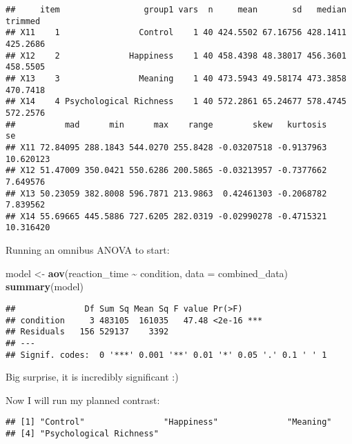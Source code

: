 \documentclass[
]{article}
\newenvironment{Shaded}{\begin{snugshade}}{\end{snugshade}}
\newcommand{\AttributeTok}[1]{\textcolor[rgb]{0.13,0.29,0.53}{#1}}
\newcommand{\CommentTok}[1]{\textcolor[rgb]{0.56,0.35,0.01}{\textit{#1}}}
\newcommand{\FunctionTok}[1]{\textcolor[rgb]{0.13,0.29,0.53}{\textbf{#1}}}
\newcommand{\NormalTok}[1]{#1}
\newcommand{\OtherTok}[1]{\textcolor[rgb]{0.56,0.35,0.01}{#1}}
\newcommand{\SpecialCharTok}[1]{\textcolor[rgb]{0.81,0.36,0.00}{\textbf{#1}}}
\begin{document}
\begin{verbatim}
##     item                 group1 vars  n     mean       sd   median  trimmed
## X11    1                Control    1 40 424.5502 67.16756 428.1411 425.2686
## X12    2              Happiness    1 40 458.4398 48.38017 456.3601 458.5505
## X13    3                Meaning    1 40 473.5943 49.58174 473.3858 470.7418
## X14    4 Psychological Richness    1 40 572.2861 65.24677 578.4745 572.2576
##          mad      min      max    range        skew   kurtosis        se
## X11 72.84095 288.1843 544.0270 255.8428 -0.03207518 -0.9137963 10.620123
## X12 51.47009 350.0421 550.6286 200.5865 -0.03213957 -0.7377662  7.649576
## X13 50.23059 382.8008 596.7871 213.9863  0.42461303 -0.2068782  7.839562
## X14 55.69665 445.5886 727.6205 282.0319 -0.02990278 -0.4715321 10.316420
\end{verbatim}

Running an omnibus ANOVA to start:

\begin{Shaded}
\begin{Highlighting}[]
\NormalTok{model }\OtherTok{\textless{}{-}} \FunctionTok{aov}\NormalTok{(reaction\_time }\SpecialCharTok{\textasciitilde{}}\NormalTok{ condition, }\AttributeTok{data =}\NormalTok{ combined\_data)}
\FunctionTok{summary}\NormalTok{(model)}
\end{Highlighting}
\end{Shaded}

\begin{verbatim}
##              Df Sum Sq Mean Sq F value Pr(>F)    
## condition     3 483105  161035   47.48 <2e-16 ***
## Residuals   156 529137    3392                   
## ---
## Signif. codes:  0 '***' 0.001 '**' 0.01 '*' 0.05 '.' 0.1 ' ' 1
\end{verbatim}

Big surprise, it is incredibly significant :)

Now I will run my planned contrast:

\begin{Shaded}
\end{Shaded}

\begin{verbatim}
## [1] "Control"                "Happiness"              "Meaning"               
## [4] "Psychological Richness"
\end{verbatim}
\end{document}
